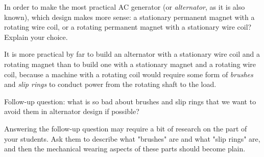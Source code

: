 

In order to make the most practical AC generator (or {\it alternator}, as it is also known), which design makes more sense: a stationary permanent magnet with a rotating wire coil, or a rotating permanent magnet with a stationary wire coil?  Explain your choice.







It is more practical by far to build an alternator with a stationary wire coil and a rotating magnet than to build one with a stationary magnet and a rotating wire coil, because a machine with a rotating coil would require some form of {\it brushes} and {\it slip rings} to conduct power from the rotating shaft to the load.

\vskip 10pt

Follow-up question: what is so bad about brushes and slip rings that we want to avoid them in alternator design if possible?







Answering the follow-up question may require a bit of research on the part of your students.  Ask them to describe what "brushes" are and what "slip rings" are, and then the mechanical wearing aspects of these parts should become plain.




